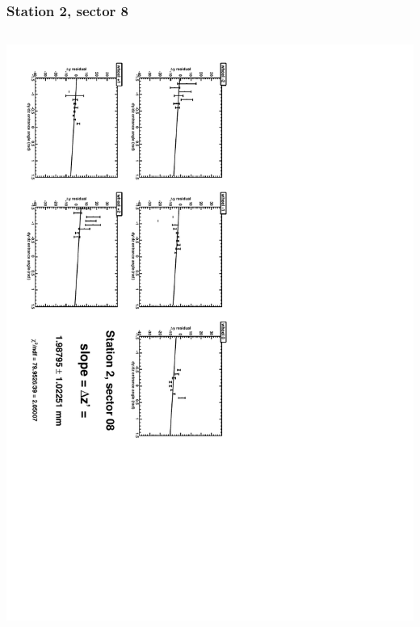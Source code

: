 \documentclass[compress]{beamer}
\begin{document}
\begin{frame}
\frametitle{Station 2, sector 8}
\begin{columns}
\includegraphics[height=\linewidth, angle=90]{zfits/zfit_2_08.pdf}


\end{columns}
\end{frame}
\end{document}
